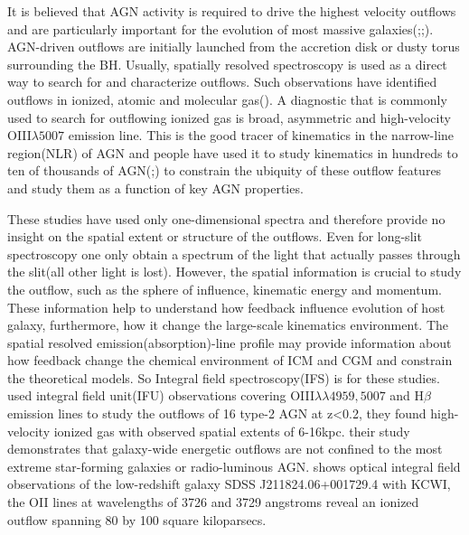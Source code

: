 \documentclass[../main.tex]{subfiles}
\begin{document}
It is believed that AGN activity is required to drive the highest velocity outflows and are particularly important for the evolution of most massive galaxies(\cite{benson2003shapes};\cite{mccarthy2011gas};\cite{harrison2018agn}). AGN-driven outflows are initially launched from the accretion disk or dusty torus surrounding the BH. Usually, spatially resolved spectroscopy is used as a direct way to search for and characterize outflows. Such observations have identified outflows in ionized, atomic and molecular gas(\cite{nesvadba2008evidence}). A diagnostic that is commonly used to search for outflowing ionized gas is broad, asymmetric and high-velocity OIII$\lambda5007$ emission line. This is the good tracer of kinematics in the narrow-line region(NLR) of AGN and people have used it to study kinematics in hundreds to ten of thousands of AGN(\cite{wang2011hierarchical};\cite{mullaney2013narrow}) to constrain the ubiquity of these outflow features and study them as a function of key AGN properties. 

These studies have used only one-dimensional spectra and therefore provide no insight on the spatial extent or structure of the outflows. Even for long-slit spectroscopy one only obtain a spectrum of the light that actually passes through the slit(all other light is lost). However, the spatial information is crucial to study the outflow, such as the sphere of influence, kinematic energy and momentum. These information help to understand how feedback influence evolution of host galaxy, furthermore, how it change the large-scale kinematics environment. The spatial resolved emission(absorption)-line profile may provide information about how feedback change the chemical environment of ICM and CGM and constrain the theoretical models. So Integral field spectroscopy(IFS) is for these studies. \cite{harrison2014kiloparsec} used integral field unit(IFU) observations covering OIII$\lambda \lambda 4959,5007$ and H$\beta$ emission lines to study the outflows of 16 type-2 AGN at z<0.2, they found high-velocity ionized gas with observed spatial extents of 6-16kpc. their study demonstrates that galaxy-wide energetic outflows are not confined to the most extreme star-forming galaxies or radio-luminous AGN. \cite{rupke2019100} shows optical integral field observations of the low-redshift galaxy SDSS J211824.06+001729.4 with KCWI, the OII lines at wavelengths of 3726 and 3729 angstroms reveal an ionized outflow spanning 80 by 100 square kiloparsecs. 
\end{document}
